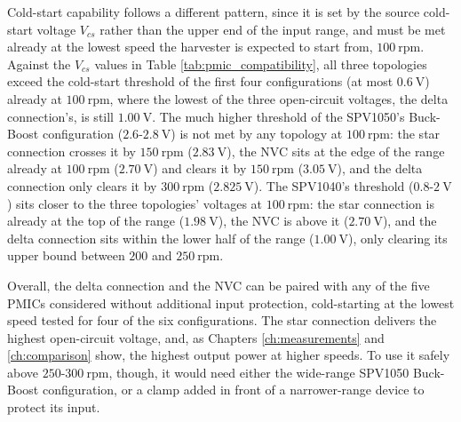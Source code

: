 Cold-start capability follows a different pattern, since it is set by the source cold-start voltage $V_{cs}$ rather than the upper end of the input range, and must be met already at the lowest speed the harvester is expected to start from, $100\ \text{rpm}$. Against the $V_{cs}$ values in Table \ref{tab:pmic_compatibility}, all three topologies exceed the cold-start threshold of the first four configurations (at most $0.6\ \text{V}$) already at $100\ \text{rpm}$, where the lowest of the three open-circuit voltages, the delta connection's, is still $1.00\ \text{V}$. The much higher threshold of the SPV1050's Buck-Boost configuration ($2.6$-$2.8\ \text{V}$) is not met by any topology at $100\ \text{rpm}$: the star connection crosses it by $150\ \text{rpm}$ ($2.83\ \text{V}$), the NVC sits at the edge of the range already at $100\ \text{rpm}$ ($2.70\ \text{V}$) and clears it by $150\ \text{rpm}$ ($3.05\ \text{V}$), and the delta connection only clears it by $300\ \text{rpm}$ ($2.825\ \text{V}$). The SPV1040's threshold ($0.8$-$2\ \text{V}$) sits closer to the three topologies' voltages at $100\ \text{rpm}$: the star connection is already at the top of the range ($1.98\ \text{V}$), the NVC is above it ($2.70\ \text{V}$), and the delta connection sits within the lower half of the range ($1.00\ \text{V}$), only clearing its upper bound between $200$ and $250\ \text{rpm}$.

Overall, the delta connection and the NVC can be paired with any of the five PMICs considered without additional input protection, cold-starting at the lowest speed tested for four of the six configurations. The star connection delivers the highest open-circuit voltage, and, as Chapters \ref{ch:measurements} and \ref{ch:comparison} show, the highest output power at higher speeds. To use it safely above $250$-$300\ \text{rpm}$, though, it would need either the wide-range SPV1050 Buck-Boost configuration, or a clamp added in front of a narrower-range device to protect its input.
